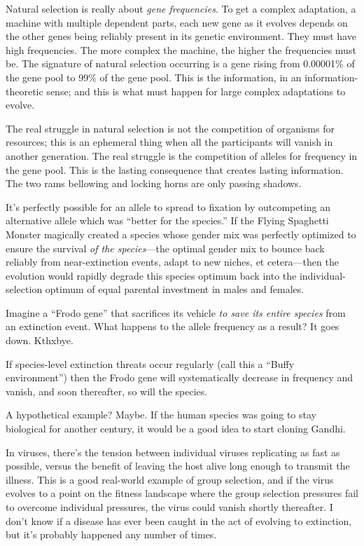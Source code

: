  Natural selection is really about \textit{gene frequencies}. To
get a complex adaptation, a machine with multiple dependent parts, each
new gene as it evolves depends on the other genes being reliably
present in its genetic environment. They must have high frequencies.
The more complex the machine, the higher the frequencies must be. The
signature of natural selection occurring is a gene rising from
0.00001\% of the gene pool to 99\% of the gene pool. This is the
information, in an information-theoretic sense; and this is what must
happen for large complex adaptations to evolve.


 The real struggle in natural selection is not the competition of
organisms for resources; this is an ephemeral thing when all the
participants will vanish in another generation. The real struggle is
the competition of alleles for frequency in the gene pool. This is the
lasting consequence that creates lasting information. The two rams
bellowing and locking horns are only passing shadows.


 It's perfectly possible for an allele to spread to
fixation by outcompeting an alternative allele which was
``better for the species.'' If the
Flying Spaghetti Monster magically created a species whose gender mix
was perfectly optimized to ensure the survival \textit{of the
species}{}---the optimal gender mix to bounce back reliably from
near-extinction events, adapt to new niches, et cetera---then the
evolution would rapidly degrade this species optimum back into the
individual-selection optimum of equal parental investment in males and
females.


 Imagine a ``Frodo gene'' that
sacrifices its vehicle \textit{to save its entire species} from an
extinction event. What happens to the allele frequency as a result? It
goes down. Kthxbye.


 If species-level extinction threats occur regularly (call this a
``Buffy environment'') then the
Frodo gene will systematically decrease in frequency and vanish, and
soon thereafter, so will the species.


 A hypothetical example? Maybe. If the human species was going to
stay biological for another century, it would be a good idea to start
cloning Gandhi.


 In viruses, there's the tension between individual
viruses replicating as fast as possible, versus the benefit of leaving
the host alive long enough to transmit the illness. This is a good
real-world example of group selection, and if the virus evolves to a
point on the fitness landscape where the group selection pressures fail
to overcome individual pressures, the virus could vanish shortly
thereafter. I don't know if a disease has ever been
caught in the act of evolving to extinction, but it's
probably happened any number of times.


